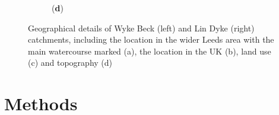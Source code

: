 \documentclass[APA,Times2COL]{WileyNJDv5}
\begin{document}
\begin{figure}[htbp!]
\begin{subfigure}[b]{.3\textwidth}
{ \parbox[b]{2.2in}{(\textbf{d})\\\rule{0ex}{1.5in}}}
\end{subfigure}
\caption{Geographical details of Wyke Beck (left) and Lin Dyke (right) catchments, including the location in the wider Leeds area with the main watercourse marked (a), the location in the UK (b), land use (c) and topography (d)} \label{fig:catchments}
\end{figure}


\section{Methods}\label{sec:methods}
\end{document}
